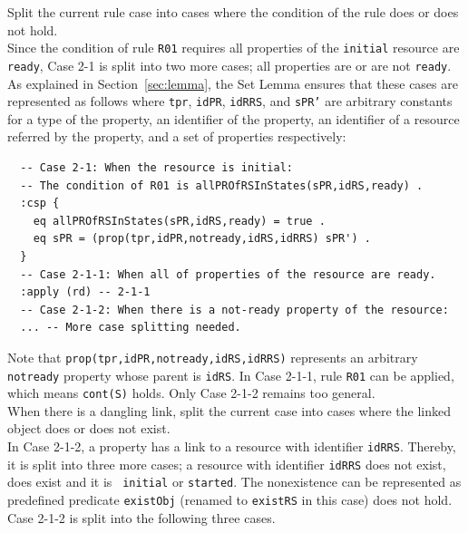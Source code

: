 \documentclass[12pt]{report}
\newcommand{\stt}[1]{{\small{\tt {#1}}}}
\begin{document}
 Split the current rule case into cases where
the condition of the rule does or does not hold. \\
Since the condition of rule {\tt R01} requires all properties of the
{\tt initial} resource are {\tt ready}, Case 2-1 is split into two
more cases; all properties are or are not {\tt ready}. As explained in
Section~\ref{sec:lemma}, the Set Lemma ensures that these cases are
represented as follows where {\tt tpr}, {\tt idPR}, {\tt idRRS}, and
{\tt sPR'} are arbitrary constants for a type of the property, an
identifier of the property, an identifier of a resource referred by
the property, and a set of properties respectively:
\small
\begin{verbatim}
  -- Case 2-1: When the resource is initial:
  -- The condition of R01 is allPROfRSInStates(sPR,idRS,ready) .
  :csp { 
    eq allPROfRSInStates(sPR,idRS,ready) = true .
    eq sPR = (prop(tpr,idPR,notready,idRS,idRRS) sPR') .
  }
  -- Case 2-1-1: When all of properties of the resource are ready.
  :apply (rd) -- 2-1-1
  -- Case 2-1-2: When there is a not-ready property of the resource:
  ... -- More case splitting needed.
\end{verbatim}
\normalsize
Note that \stt{prop(tpr,idPR,notready,idRS,idRRS)} represents an
arbitrary {\tt notready} property whose parent is {\tt idRS}. In Case
2-1-1, rule {\tt R01} can be applied, which means \stt{cont(S)} holds. Only
Case 2-1-2 remains too general.\\

 When there is a dangling link, split the
current case into cases where the linked object does or does not
exist. \\
In Case 2-1-2, a property has a link to a resource with identifier
{\tt idRRS}. Thereby, it is split into three more cases; a resource
with identifier {\tt idRRS} does not exist, does exist and it is {\tt
  initial} or {\tt started}. The nonexistence can be represented as
predefined predicate {\tt existObj} (renamed to {\tt existRS} in this
case) does not hold. Case 2-1-2 is split into the following three
cases.
\end{document}
